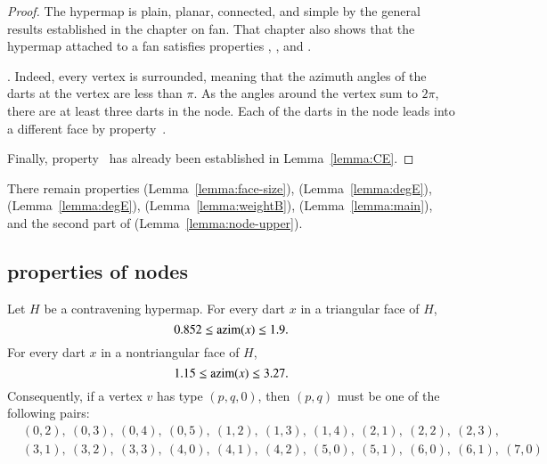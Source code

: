 \begin{proof}
The hypermap is plain, planar, connected, and simple by the general results established in the chapter on fan.  That chapter also shows that the hypermap attached to a fan satisfies properties , , and .

.  Indeed, every vertex is surrounded, meaning that the azimuth angles of the darts at the vertex are less than $\pi$.  As the angles around the vertex sum to $2\pi$, there are at least three darts in the node. Each of the darts in the node leads into a different face by property~.

Finally, property~ has already been established in Lemma~\ref{lemma:CE}.
\end{proof}

There remain properties  (Lemma~\ref{lemma:face-size}), %
 (Lemma~\ref{lemma:degE}),   (Lemma~\ref{lemma:degE}),  (Lemma~\ref{lemma:weightB}),  (Lemma~\ref{lemma:main}), 
and the second part of  (Lemma~\ref{lemma:node-upper}).


\subsection{properties of nodes}
%



\begin{lemma} \label{lemma:0.852}
Let $H$ be a contravening
hypermap. For every dart $x$ in a triangular face of $H$,
    $$0.852\le {\operatorname{azim}}(x)\le 1.9.$$
For every dart $x$ in a nontriangular face of $H$, 
    $$1.15\le{\operatorname{azim}}(x)\le 3.27.$$
%
%
%
Consequently, if a vertex $v$ has type $(p,q,0)$, then $(p,q)$
must be one of the following pairs:
$$
\begin{array}{lll}
&(0,2),~(0,3),~(0,4),~(0,5),~(1,2),~(1,3),~(1,4),~(2,1),~(2,2),~(2,3),\\
&(3,1),~(3,2),~(3,3),~(4,0),~(4,1),~(4,2),~(5,0),~(5,1),~(6,0),~(6,1),~(7,0)
\end{array}
$$
\end{lemma}
 

